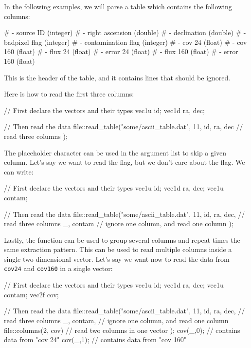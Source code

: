 \documentclass[12pt]{report}
\begin{document}
\begin{itemize}
In the following examples, we will parse a table which contains the following columns:
\begin{bashcode}
#  - source ID              (integer)
#  - right ascension        (double)
#  - declination            (double)
#  - badpixel flag          (integer)
#  - contamination flag     (integer)
#  - cov   24               (float)
#  - cov   160              (float)
#  - flux  24               (float)
#  - error 24               (float)
#  - flux  160              (float)
#  - error 160              (float)
\end{bashcode}
This is the header of the table, and it contains  lines that should be ignored.

Here is how to read the first three columns:
\begin{cppcode}
// First declare the vectors and their types
vec1u id;
vec1d ra, dec;

// Then read the data
file::read_table("some/ascii_table.dat", 11,
    id, ra, dec // read three columns
);
\end{cppcode}

The placeholder character \cppinline{_} can be used in the argument list to skip a given column. Let's say we want to read the  flag, but we don't care about the  flag. We can write:
\begin{cppcode}
// First declare the vectors and their types
vec1u id;
vec1d ra, dec;
vec1u contam;

// Then read the data
file::read_table("some/ascii_table.dat", 11,
    id, ra, dec, // read three columns
    _, contam    // ignore one column, and read one column
);
\end{cppcode}

Lastly, the  function can be used to group several columns and repeat  times the same extraction pattern. This can be used to read multiple columns inside a single two-dimensional vector. Let's say we want now to read the data from \texttt{cov24} and \texttt{cov160} in a single vector:
\begin{cppcode}
// First declare the vectors and their types
vec1u id;
vec1d ra, dec;
vec1u contam;
vec2f cov;

// Then read the data
file::read_table("some/ascii_table.dat", 11,
    id, ra, dec, // read three columns
    _, contam,   // ignore one column, and read one column
    file::columns(2, cov) // read two columns in one vector
);
cov(_,0); // contains data from "cov 24"
cov(_,1); // contains data from "cov 160"
\end{cppcode}


\end{itemize}
\end{document}
